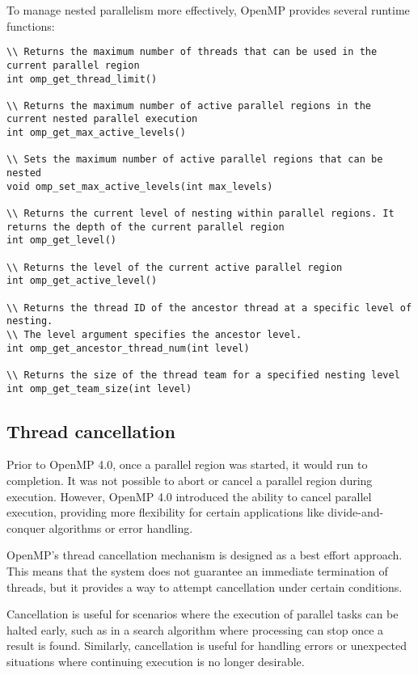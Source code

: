 To manage nested parallelism more effectively, OpenMP provides several runtime functions:
\begin{lstlisting}[style=C]
\\ Returns the maximum number of threads that can be used in the current parallel region
int omp_get_thread_limit()

\\ Returns the maximum number of active parallel regions in the current nested parallel execution
int omp_get_max_active_levels()

\\ Sets the maximum number of active parallel regions that can be nested
void omp_set_max_active_levels(int max_levels)

\\ Returns the current level of nesting within parallel regions. It returns the depth of the current parallel region
int omp_get_level()

\\ Returns the level of the current active parallel region
int omp_get_active_level()

\\ Returns the thread ID of the ancestor thread at a specific level of nesting. 
\\ The level argument specifies the ancestor level.
int omp_get_ancestor_thread_num(int level)

\\ Returns the size of the thread team for a specified nesting level
int omp_get_team_size(int level)
\end{lstlisting}

\subsection{Thread cancellation}
Prior to OpenMP 4.0, once a parallel region was started, it would run to completion. 
It was not possible to abort or cancel a parallel region during execution. 
However, OpenMP 4.0 introduced the ability to cancel parallel execution, providing more flexibility for certain applications like divide-and-conquer algorithms or error handling.

OpenMP's thread cancellation mechanism is designed as a best effort approach. 
This means that the system does not guarantee an immediate termination of threads, but it provides a way to attempt cancellation under certain conditions.

Cancellation is useful for scenarios where the execution of parallel tasks can be halted early, such as in a search algorithm where processing can stop once a result is found. 
Similarly, cancellation is useful for handling errors or unexpected situations where continuing execution is no longer desirable.

